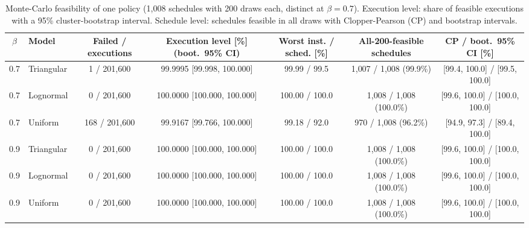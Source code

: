 \begin{table}[htbp]
\centering
\caption{Monte-Carlo feasibility of one policy (1{,}008 schedules with 200 draws each, \credDistinctSeven{} distinct at $\beta=0.7$). Execution level: share of feasible executions with a 95\% cluster-bootstrap interval. Schedule level: schedules feasible in all draws with Clopper-Pearson (CP) and bootstrap intervals.}
\label{tab:cred}
\scriptsize
\setlength{\tabcolsep}{4pt}
\begin{tabular}{clccccc}
\toprule
$\beta$ & Model & Failed / executions & Execution level [\%] (boot.\ 95\% CI) & Worst inst. / sched. [\%] & All-200-feasible schedules & CP / boot.\ 95\% CI [\%] \\
\midrule
0.7 & Triangular & 1 / 201{,}600 & 99.9995 [99.998, 100.000] & 99.99 / 99.5 & 1{,}007 / 1{,}008 (99.9\%) & [99.4, 100.0] / [99.5, 100.0] \\
0.7 & Lognormal & 0 / 201{,}600 & 100.0000 [100.000, 100.000] & 100.00 / 100.0 & 1{,}008 / 1{,}008 (100.0\%) & [99.6, 100.0] / [100.0, 100.0] \\
0.7 & Uniform & 168 / 201{,}600 & 99.9167 [99.766, 100.000] & 99.18 / 92.0 & 970 / 1{,}008 (96.2\%) & [94.9, 97.3] / [89.4, 100.0] \\
0.9 & Triangular & 0 / 201{,}600 & 100.0000 [100.000, 100.000] & 100.00 / 100.0 & 1{,}008 / 1{,}008 (100.0\%) & [99.6, 100.0] / [100.0, 100.0] \\
0.9 & Lognormal & 0 / 201{,}600 & 100.0000 [100.000, 100.000] & 100.00 / 100.0 & 1{,}008 / 1{,}008 (100.0\%) & [99.6, 100.0] / [100.0, 100.0] \\
0.9 & Uniform & 0 / 201{,}600 & 100.0000 [100.000, 100.000] & 100.00 / 100.0 & 1{,}008 / 1{,}008 (100.0\%) & [99.6, 100.0] / [100.0, 100.0] \\
\bottomrule
\end{tabular}
\end{table}
